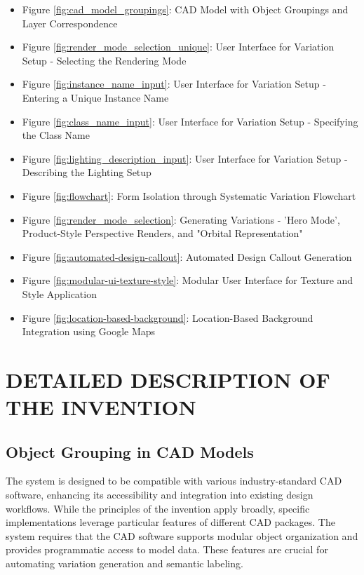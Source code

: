 \documentclass[12pt]{report}
\begin{document}
\begin{itemize}
    \item Figure \ref{fig:cad_model_groupings}: CAD Model with Object Groupings and Layer Correspondence
    \item Figure \ref{fig:render_mode_selection_unique}: User Interface for Variation Setup - Selecting the Rendering Mode
    \item Figure \ref{fig:instance_name_input}: User Interface for Variation Setup - Entering a Unique Instance Name
    \item Figure \ref{fig:class_name_input}: User Interface for Variation Setup - Specifying the Class Name
    \item Figure \ref{fig:lighting_description_input}: User Interface for Variation Setup - Describing the Lighting Setup
    \item Figure \ref{fig:flowchart}: Form Isolation through Systematic Variation Flowchart
    \item Figure \ref{fig:render_mode_selection}: Generating Variations - 'Hero Mode', Product-Style Perspective Renders, and "Orbital Representation" 
    \item Figure \ref{fig:automated-design-callout}: Automated Design Callout Generation
    \item Figure \ref{fig:modular-ui-texture-style}:  Modular User Interface for Texture and Style Application
    \item Figure \ref{fig:location-based-background}:  Location-Based Background Integration using Google Maps
\end{itemize}


\section{DETAILED DESCRIPTION OF THE INVENTION}


\subsection{Object Grouping in CAD Models}

The system is designed to be compatible with various industry-standard CAD software, enhancing its accessibility and integration into existing design workflows. While the principles of the invention apply broadly, specific implementations leverage particular features of different CAD packages. The system requires that the CAD software supports modular object organization and provides programmatic access to model data. These features are crucial for automating variation generation and semantic labeling.
\end{document}
